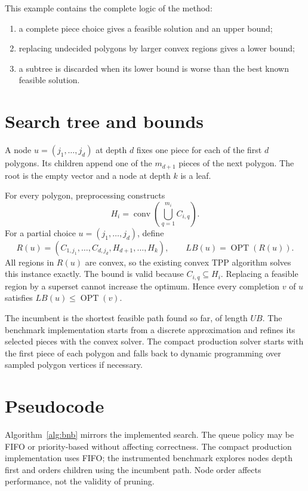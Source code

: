 \documentclass[11pt]{article}
\newcommand{\conv}{\operatorname{conv}}
\newcommand{\OPT}{\operatorname{OPT}}
\begin{document}
This example contains the complete logic of the method:
\begin{enumerate}
	\item a complete piece choice gives a feasible solution and an upper bound;
	\item replacing undecided polygons by larger convex regions gives a lower bound;
	\item a subtree is discarded when its lower bound is worse than the best
	known feasible solution.
\end{enumerate}

\section{Search tree and bounds}

A node $u=(j_1,\ldots,j_d)$ at depth $d$ fixes one piece for each of the first
$d$ polygons. Its children append one of the $m_{d+1}$ pieces of the next
polygon. The root is the empty vector and a node at depth $k$ is a leaf.

For every polygon, preprocessing constructs
\[
	H_i=\conv\left(\bigcup_{q=1}^{m_i}C_{i,q}\right).
\]
For a partial choice $u=(j_1,\ldots,j_d)$, define
\[
	R(u)=(C_{1,j_1},\ldots,C_{d,j_d},H_{d+1},\ldots,H_k),
	\qquad LB(u)=\OPT(R(u)).
\]
All regions in $R(u)$ are convex, so the existing convex TPP algorithm solves
this instance exactly. The bound is valid because $C_{i,q}\subseteq H_i$.
Replacing a feasible region by a superset cannot increase the optimum. Hence
every completion $v$ of $u$ satisfies $LB(u)\leq\OPT(v)$.

The incumbent is the shortest feasible path found so far, of length $UB$.
The benchmark implementation starts from a discrete approximation and refines
its selected pieces with the convex solver. The compact production solver
starts with the first piece of each polygon and falls back to dynamic
programming over sampled polygon vertices if necessary.

\section{Pseudocode}

Algorithm~\ref{alg:bnb} mirrors the implemented search. The queue policy may
be FIFO or priority-based without affecting correctness. The compact
production implementation uses FIFO; the instrumented benchmark explores
nodes depth first and orders children using the incumbent path. Node order
affects performance, not the validity of pruning.
\end{document}
